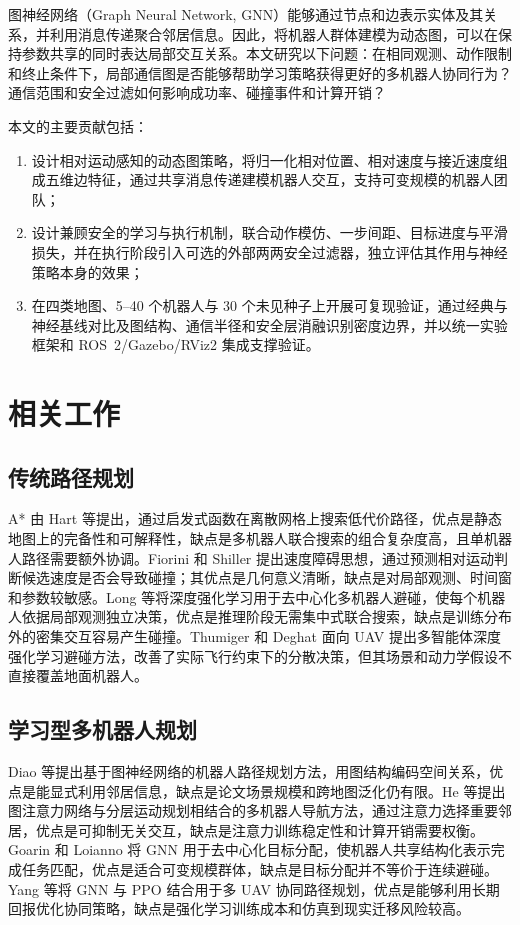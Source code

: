 \documentclass[UTF8,a4paper,11pt]{ctexart}
\begin{document}
图神经网络（Graph Neural Network, GNN）能够通过节点和边表示实体及其关系，并利用消息传递聚合邻居信息。因此，将机器人群体建模为动态图，可以在保持参数共享的同时表达局部交互关系。本文研究以下问题：在相同观测、动作限制和终止条件下，局部通信图是否能够帮助学习策略获得更好的多机器人协同行为？通信范围和安全过滤如何影响成功率、碰撞事件和计算开销？

本文的主要贡献包括：
\begin{enumerate}
  \item 设计相对运动感知的动态图策略，将归一化相对位置、相对速度与接近速度组成五维边特征，通过共享消息传递建模机器人交互，支持可变规模的机器人团队；
  \item 设计兼顾安全的学习与执行机制，联合动作模仿、一步间距、目标进度与平滑损失，并在执行阶段引入可选的外部两两安全过滤器，独立评估其作用与神经策略本身的效果；
  \item 在四类地图、5--40 个机器人与 30 个未见种子上开展可复现验证，通过经典与神经基线对比及图结构、通信半径和安全层消融识别密度边界，并以统一实验框架和 ROS~2/Gazebo/RViz2 集成支撑验证。
\end{enumerate}

\section{相关工作}
\subsection{传统路径规划}
A* 由 Hart 等提出，通过启发式函数在离散网格上搜索低代价路径，优点是静态地图上的完备性和可解释性，缺点是多机器人联合搜索的组合复杂度高，且单机器人路径需要额外协调\cite{hart1968}。Fiorini 和 Shiller 提出速度障碍思想，通过预测相对运动判断候选速度是否会导致碰撞；其优点是几何意义清晰，缺点是对局部观测、时间窗和参数较敏感\cite{fiorini1998}。Long 等将深度强化学习用于去中心化多机器人避碰，使每个机器人依据局部观测独立决策，优点是推理阶段无需集中式联合搜索，缺点是训练分布外的密集交互容易产生碰撞\cite{long2018orcamarl}。Thumiger 和 Deghat 面向 UAV 提出多智能体深度强化学习避碰方法，改善了实际飞行约束下的分散决策，但其场景和动力学假设不直接覆盖地面机器人\cite{thumiger2022uav}。

\subsection{学习型多机器人规划}
Diao 等提出基于图神经网络的机器人路径规划方法，用图结构编码空间关系，优点是能显式利用邻居信息，缺点是论文场景规模和跨地图泛化仍有限\cite{diao2024gnn}。He 等提出图注意力网络与分层运动规划相结合的多机器人导航方法，通过注意力选择重要邻居，优点是可抑制无关交互，缺点是注意力训练稳定性和计算开销需要权衡\cite{he2023ganav}。Goarin 和 Loianno 将 GNN 用于去中心化目标分配，使机器人共享结构化表示完成任务匹配，优点是适合可变规模群体，缺点是目标分配并不等价于连续避碰\cite{goarin2024assignment}。Yang 等将 GNN 与 PPO 结合用于多 UAV 协同路径规划，优点是能够利用长期回报优化协同策略，缺点是强化学习训练成本和仿真到现实迁移风险较高\cite{yang2025uav}。
\end{document}
